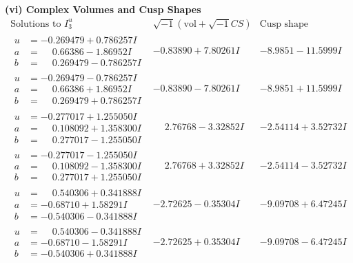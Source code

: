 \documentclass[1p]{elsarticle_modified}
\theoremstyle{definition}
\newcommand{\I}{\sqrt{-1}}
\begin{document}
\newpage\flushleft \textbf{(vi) Complex Volumes and Cusp Shapes}
$$\begin{array}{c|c|c}  
\text{Solutions to }I^u_{3}& \I (\text{vol} + \sqrt{-1}CS) & \text{Cusp shape}\\
 \hline 
\begin{aligned}
u &= -0.269479 + 0.786257 I \\
a &= \phantom{-}0.66386 - 1.86952 I \\
b &= \phantom{-}0.269479 - 0.786257 I\end{aligned}
 & -0.83890 + 7.80261 I & -8.9851 - 11.5999 I \\ \hline\begin{aligned}
u &= -0.269479 - 0.786257 I \\
a &= \phantom{-}0.66386 + 1.86952 I \\
b &= \phantom{-}0.269479 + 0.786257 I\end{aligned}
 & -0.83890 - 7.80261 I & -8.9851 + 11.5999 I \\ \hline\begin{aligned}
u &= -0.277017 + 1.255050 I \\
a &= \phantom{-}0.108092 + 1.358300 I \\
b &= \phantom{-}0.277017 - 1.255050 I\end{aligned}
 & \phantom{-}2.76768 - 3.32852 I & -2.54114 + 3.52732 I \\ \hline\begin{aligned}
u &= -0.277017 - 1.255050 I \\
a &= \phantom{-}0.108092 - 1.358300 I \\
b &= \phantom{-}0.277017 + 1.255050 I\end{aligned}
 & \phantom{-}2.76768 + 3.32852 I & -2.54114 - 3.52732 I \\ \hline\begin{aligned}
u &= \phantom{-}0.540306 + 0.341888 I \\
a &= -0.68710 + 1.58291 I \\
b &= -0.540306 - 0.341888 I\end{aligned}
 & -2.72625 - 0.35304 I & -9.09708 + 6.47245 I \\ \hline\begin{aligned}
u &= \phantom{-}0.540306 - 0.341888 I \\
a &= -0.68710 - 1.58291 I \\
b &= -0.540306 + 0.341888 I\end{aligned}
 & -2.72625 + 0.35304 I & -9.09708 - 6.47245 I \\ \hline\begin{aligned}

\end{aligned}
\end{array}$$
\end{document}
